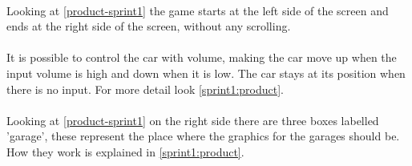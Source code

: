 \paragraph{}\label{sprint1:req1}
Looking at \cref{product-sprint1} the game starts at the left side of the screen and ends at the right side of the screen, without any scrolling.
\paragraph{}\label{sprint1:req2}
It is possible to control the car with volume, making the car move up when the input volume is high and down when it is low.
The car stays at its position when there is no input.
For more detail look \cref{sprint1:product}.
\paragraph{}\label{sprint1:req4}
Looking at \cref{product-sprint1} on the right side there are three boxes labelled 'garage', these represent the place where the graphics for the garages should be.
How they work is explained in \cref{sprint1:product}.